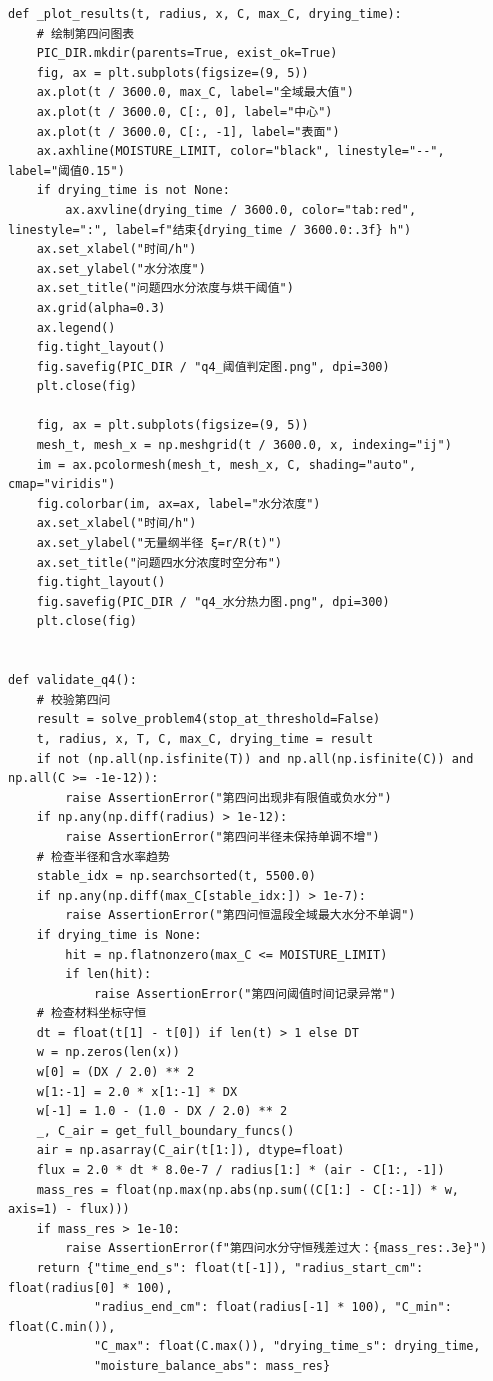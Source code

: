 \documentclass[withoutpreface,bwprint]{cumcm_thesis}
\begin{document}
\begin{appendices}
\begin{lstlisting}
def _plot_results(t, radius, x, C, max_C, drying_time):
    # 绘制第四问图表
    PIC_DIR.mkdir(parents=True, exist_ok=True)
    fig, ax = plt.subplots(figsize=(9, 5))
    ax.plot(t / 3600.0, max_C, label="全域最大值")
    ax.plot(t / 3600.0, C[:, 0], label="中心")
    ax.plot(t / 3600.0, C[:, -1], label="表面")
    ax.axhline(MOISTURE_LIMIT, color="black", linestyle="--", label="阈值0.15")
    if drying_time is not None:
        ax.axvline(drying_time / 3600.0, color="tab:red", linestyle=":", label=f"结束{drying_time / 3600.0:.3f} h")
    ax.set_xlabel("时间/h")
    ax.set_ylabel("水分浓度")
    ax.set_title("问题四水分浓度与烘干阈值")
    ax.grid(alpha=0.3)
    ax.legend()
    fig.tight_layout()
    fig.savefig(PIC_DIR / "q4_阈值判定图.png", dpi=300)
    plt.close(fig)

    fig, ax = plt.subplots(figsize=(9, 5))
    mesh_t, mesh_x = np.meshgrid(t / 3600.0, x, indexing="ij")
    im = ax.pcolormesh(mesh_t, mesh_x, C, shading="auto", cmap="viridis")
    fig.colorbar(im, ax=ax, label="水分浓度")
    ax.set_xlabel("时间/h")
    ax.set_ylabel("无量纲半径 ξ=r/R(t)")
    ax.set_title("问题四水分浓度时空分布")
    fig.tight_layout()
    fig.savefig(PIC_DIR / "q4_水分热力图.png", dpi=300)
    plt.close(fig)


def validate_q4():
    # 校验第四问
    result = solve_problem4(stop_at_threshold=False)
    t, radius, x, T, C, max_C, drying_time = result
    if not (np.all(np.isfinite(T)) and np.all(np.isfinite(C)) and np.all(C >= -1e-12)):
        raise AssertionError("第四问出现非有限值或负水分")
    if np.any(np.diff(radius) > 1e-12):
        raise AssertionError("第四问半径未保持单调不增")
    # 检查半径和含水率趋势
    stable_idx = np.searchsorted(t, 5500.0)
    if np.any(np.diff(max_C[stable_idx:]) > 1e-7):
        raise AssertionError("第四问恒温段全域最大水分不单调")
    if drying_time is None:
        hit = np.flatnonzero(max_C <= MOISTURE_LIMIT)
        if len(hit):
            raise AssertionError("第四问阈值时间记录异常")
    # 检查材料坐标守恒
    dt = float(t[1] - t[0]) if len(t) > 1 else DT
    w = np.zeros(len(x))
    w[0] = (DX / 2.0) ** 2
    w[1:-1] = 2.0 * x[1:-1] * DX
    w[-1] = 1.0 - (1.0 - DX / 2.0) ** 2
    _, C_air = get_full_boundary_funcs()
    air = np.asarray(C_air(t[1:]), dtype=float)
    flux = 2.0 * dt * 8.0e-7 / radius[1:] * (air - C[1:, -1])
    mass_res = float(np.max(np.abs(np.sum((C[1:] - C[:-1]) * w, axis=1) - flux)))
    if mass_res > 1e-10:
        raise AssertionError(f"第四问水分守恒残差过大：{mass_res:.3e}")
    return {"time_end_s": float(t[-1]), "radius_start_cm": float(radius[0] * 100),
            "radius_end_cm": float(radius[-1] * 100), "C_min": float(C.min()),
            "C_max": float(C.max()), "drying_time_s": drying_time,
            "moisture_balance_abs": mass_res}



\end{lstlisting}
\end{appendices}
\end{document}

